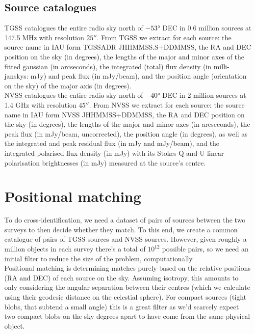 \documentclass[12pt,a4paper]{article}
\begin{document}
\newpage
\subsection{Source catalogues}
\label{sec:source_catalogues}
TGSS catalogues the entire radio sky north of $-\ang{53}$ DEC in 0.6 million sources at 147.5 MHz with resolution $\ang{;;25}$. From TGSS we extract for each source: the source name in IAU form TGSSADR JHHMMSS.S+DDMMSS, the RA and DEC position on the sky (in degrees), the lengths of the major and minor axes of the fitted gaussian (in arcseconds), the integrated (total) flux density (in milli-janskys: mJy) and peak flux (in mJy/beam), and the position angle (orientation on the sky) of the major axis (in degrees).\\

NVSS catalogues the entire radio sky north of $-\ang{40}$ DEC in 2 million sources at 1.4 GHz with resolution $\ang{;;45}$. From NVSS we extract for each source: the source name in IAU form NVSS JHHMMSS+DDMMSS, the RA and DEC position on the sky (in degrees), the lengths of the major and minor axes (in arcseconds), the peak flux (in mJy/beam, uncorrected), the position angle (in degrees), as well as the integrated and peak residual flux (in mJy and mJy/beam), and the integrated polarised flux density (in mJy) with its Stokes Q and U linear polarisation brightnesses (in mJy) measured at the source's centre.

\newpage
\section{Positional matching}
\label{sec:positional_matching}
To do cross-identification, we need a dataset of pairs of sources between the two surveys to then decide whether they match. To this end, we create a common catalogue of pairs of TGSS sources and NVSS sources. However, given roughly a million objects in each survey there's a total of $10^{12}$ possible pairs, so we need an initial filter to reduce the size of the problem, computationally.\\

Positional matching is determining matches purely based on the relative positions (RA and DEC) of each source on the sky. Assuming isotropy, this amounts to only considering the angular separation between their centres (which we calculate using their geodesic distance on the celestial sphere). For compact sources (tight blobs, that subtend a small angle) this is a great filter as we'd scarcely expect two compact blobs on the sky degrees apart to have come from the same physical object. \\
\end{document}
